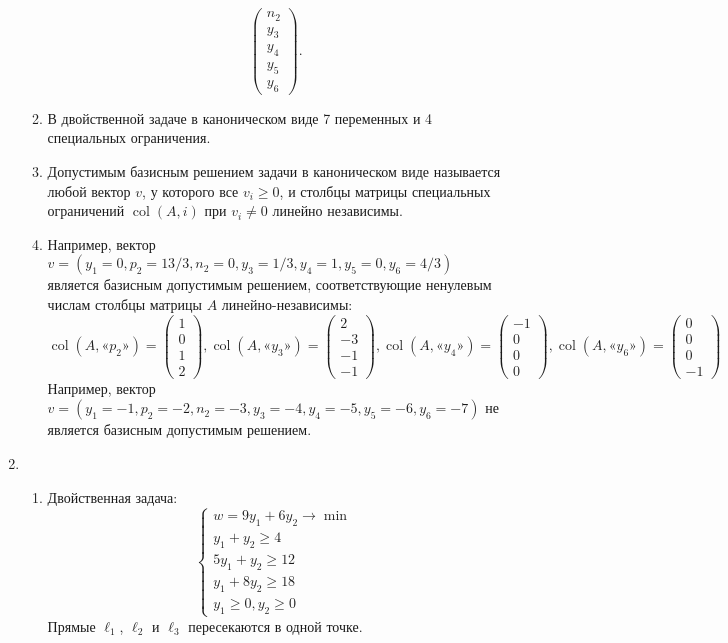\documentclass[12pt]{article}
\DeclareMathOperator{\col}{col}
\begin{document}
\begin{enumerate}
\begin{enumerate}
\[\begin{pmatrix}
        n_2 \\
        y_3 \\
        y_4 \\
        y_5 \\
        y_6
      \end{pmatrix}.
      \]
    \item В двойственной задаче в каноническом виде 7 переменных и 4 специальных ограничения. 
    \item Допустимым базисным решением задачи в каноническом виде называется любой вектор $v$, 
    у которого все $v_i \geq 0$, и столбцы матрицы специальных ограничений $\col(A, i)$ при $v_i \neq 0$ линейно независимы.
\item Например, вектор $v = (y_1 = 0, p_2 = 13/3,  n_2 = 0, y_3 = 1/3, y_4 =1, y_5 = 0, y_6 = 4/3)$ является базисным допустимым решением,
соответствующие ненулевым числам столбцы матрицы $A$ линейно-независимы:
\[
\col(A, \text{«}p_2\text{»}) = \begin{pmatrix}
  1 \\ 0 \\ 1 \\ 2 
\end{pmatrix},
\col(A, \text{«}y_3\text{»}) = \begin{pmatrix}
  2 \\ -3 \\ -1 \\ -1 
\end{pmatrix},
\col(A, \text{«}y_4\text{»}) = \begin{pmatrix}
  -1 \\ 0 \\ 0 \\ 0
\end{pmatrix},
\col(A, \text{«}y_6\text{»}) = \begin{pmatrix}
  0 \\ 0 \\ 0 \\ -1
\end{pmatrix}
\]
Например, вектор $v = (y_1=-1, p_2=-2, n_2=-3, y_3=-4, y_4=-5, y_5=-6, y_6=-7)$ не является базисным допустимым решением. 
\end{enumerate}
    
    
    \item 
    \begin{enumerate}
        \item 
    Двойственная задача:
    \[
    \begin{cases}
    w = 9y_1 + 6y_2 \to \min \\
    y_1 + y_2 \geq 4 \\
    5y_1 + y_2 \geq 12 \\
    y_1 + 8y_2 \geq 18 \\
    y_1 \geq 0, y_2 \geq 0 
    \end{cases}
    \]
    Прямые $\ell_1$, $\ell_2$ и $\ell_3$ пересекаются в одной точке. 
    

\end{enumerate}
\end{enumerate}
\end{document}
